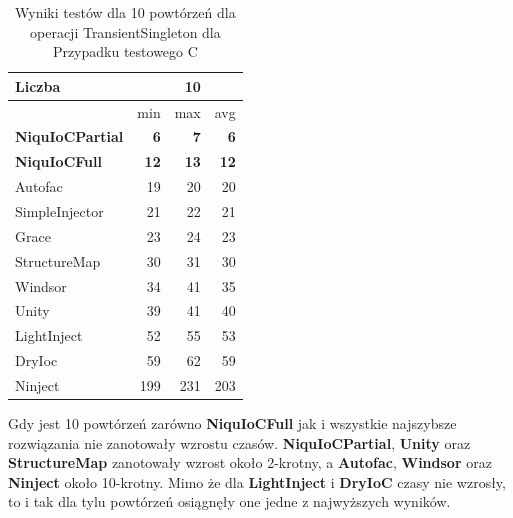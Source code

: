 \documentclass[12pt]{article}
\begin{document}
\begin{table}[H]
\captionsetup{belowskip=0pt,aboveskip=0pt}
\begin{center}
\begin{small}
	\begin{tabular}{ | l | r r r | }
    		\hline
Liczba & & 10 & \\ \hline
 & min & max & avg \\ \hline
\textbf{NiquIoCPartial} & \textbf{6} & \textbf{7} & \textbf{6} \\ \hline
\textbf{NiquIoCFull} & \textbf{12} & \textbf{13} & \textbf{12} \\ \hline
Autofac & 19 & 20 & 20 \\ \hline
SimpleInjector & 21 & 22 & 21 \\ \hline
Grace & 23 & 24 & 23 \\ \hline
StructureMap & 30 & 31 & 30 \\ \hline
Windsor & 34 & 41 & 35 \\ \hline
Unity & 39 & 41 & 40 \\ \hline
LightInject & 52 & 55 & 53 \\ \hline
DryIoc & 59 & 62 & 59 \\ \hline
Ninject & 199 & 231 & 203 \\ \hline
  	\end{tabular}
\end{small}
\end{center}
\caption{Wyniki testów dla 10 powtórzeń dla operacji TransientSingleton dla Przypadku testowego C}
\label{TestCaseC_TransientSingleton10}
\end{table}
Gdy jest 10 powtórzeń zarówno \textbf{NiquIoCFull} jak i wszystkie najszybsze rozwiązania nie zanotowały wzrostu czasów. \textbf{NiquIoCPartial}, \textbf{Unity} oraz \textbf{StructureMap} zanotowały wzrost około 2-krotny, a \textbf{Autofac}, \textbf{Windsor} oraz \textbf{Ninject} około 10-krotny. Mimo że dla \textbf{LightInject} i \textbf{DryIoC} czasy nie wzrosły, to i tak dla tylu powtórzeń osiągnęły one jedne z najwyższych wyników.
\\ \\
\end{document}
